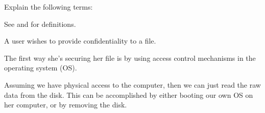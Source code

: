 \documentclass[svv,addpoints]{miunexam}
\begin{document}
\begin{questions}
  \question\label{q:terminology:crypto::security:E}
  Explain the following terms:
  \begin{solution}
    See \cite{Gollmann2011cs} and \cite{Anderson2008sea} for definitions.
  \end{solution}


  \question\label{q:os:crypto:E:C}
  A user wishes to provide confidentiality to a file.
  \begin{solution}
    The first way she's securing her file is by using access control mechanisms 
    in the operating system (OS).

    Assuming we have physical access to the computer, then we can just read the 
    raw data from the disk.
    This can be accomplished by either booting our own OS on her computer, or 
    by removing the disk.


\end{solution}
\end{questions}
\end{document}

